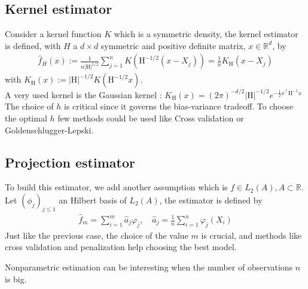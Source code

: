 \documentclass{article}
\begin{document}
\subsection{Kernel estimator}
Consider a kernel function \(K\) which is a symmetric density, the kernel estimator is defined, with \(H\) a \(d\times d\) symmetric and positive definite matrix, \(x\in\mathbb{R}^d\), by 
\begin{align}
\hat{f}_H(x):=\frac{1}{n|\mathrm{H}|^{1/2}}\sum_{j=1}^n K\left(\mathrm{H}^{-1/2}(x-X_j)\right)=\frac{1}{n}K_\mathrm{H}\left(x-X_j\right)
\end{align}
with \(K_\mathrm{H}(x):= |\mathrm{H}|^{-1/2}K(\mathrm{H}^{-1/2}x)\). \\
A very used kernel is the Gaussian kernel : \(K_\textrm{H}(x)=(2\pi)^{-d/2}|\textrm{H}|^{-1/2}e^{-\frac{1}{2} x^\intercal \textrm{H}^{-1} x}\) \\
The choice of \(h\) is critical since it governs the bias-variance tradeoff. To choose the optimal \(h\) few methods could be used like Cross validation or Goldenschlugger-Lepski.

\subsection{Projection estimator}
To build this estimator, we add another assumption which is \(f\in L_2(A), A\subset \mathbb{R}\). \\
Let \((\phi_j)_{j\le 1}\) an Hilbert basis of \(L_2(A)\), the estimator is defined by 
\begin{align}
    \hat{f}_m=\sum_{i=1}^m\hat{a}_j\varphi_j, \quad \hat{a}_j=\frac{1}{n}\sum_{i=1}^n \varphi_j(X_i)
\end{align}
Just like the previous case, the choice of the value \(m\) is crucial, and methods like cross validation and penalization help choosing the best model.

\bigskip
Nonparametric estimation can be interesting when the number of observations \(n\) is big.

\newpage
\nocite{Coste_2025}
\nocite{lipman2024flowmatchingguidecode}
\nocite{strasman2025analysisnoiseschedulescorebased}


\end{document}
